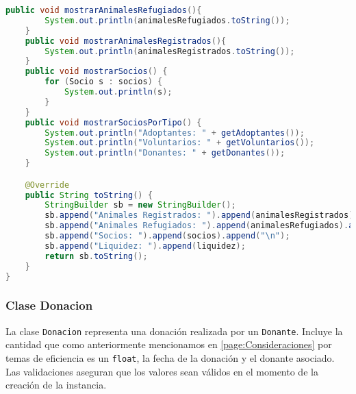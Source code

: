 \begin{lstlisting}[style = javaNormal, language=Java]
    public void mostrarAnimalesRefugiados(){
        System.out.println(animalesRefugiados.toString());
    }
    public void mostrarAnimalesRegistrados(){
        System.out.println(animalesRegistrados.toString());
    }
    public void mostrarSocios() {
        for (Socio s : socios) {
            System.out.println(s);
        }
    }
    public void mostrarSociosPorTipo() {
        System.out.println("Adoptantes: " + getAdoptantes());
        System.out.println("Voluntarios: " + getVoluntarios());
        System.out.println("Donantes: " + getDonantes());
    }

    @Override
    public String toString() {
        StringBuilder sb = new StringBuilder();
        sb.append("Animales Registrados: ").append(animalesRegistrados).append("\n");
        sb.append("Animales Refugiados: ").append(animalesRefugiados).append("\n");
        sb.append("Socios: ").append(socios).append("\n");
        sb.append("Liquidez: ").append(liquidez);
        return sb.toString();
    }
}
\end{lstlisting}



\subsubsection{Clase Donacion}\label{codigo:donacion}
La clase \texttt{Donacion} representa una donación realizada por un \texttt{Donante}. 
Incluye la cantidad que como anteriormente mencionamos en \ref{page:Consideraciones} por temas de eficiencia es un \texttt{float},
la fecha de la donación y el donante asociado. Las validaciones 
aseguran que los valores sean válidos en el momento de la creación de la instancia.

